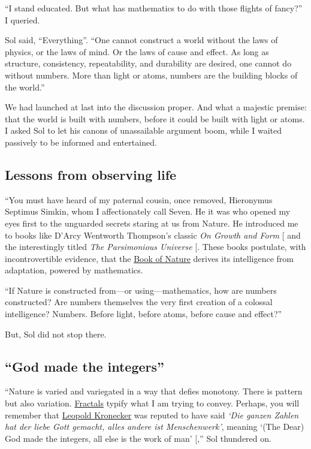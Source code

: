 \documentclass[
  a4paper,
]{article}
\begin{document}
``I stand educated. But what has mathematics to do with those flights of
fancy?'' I queried.

Sol said, ``Everything''. ``One cannot construct a world without the
laws of physics, or the laws of mind. Or the laws of cause and effect.
As long as structure, consistency, repeatability, and durability are
desired, one cannot do without numbers. More than light or atoms,
numbers are the building blocks of the world.''

We had launched at last into the discussion proper. And what a majestic
premise: that the world is built with numbers, before it could be built
with light or atoms. I asked Sol to let his canons of unassailable
argument boom, while I waited passively to be informed and entertained.

\subsection{Lessons from observing
life}\label{lessons-from-observing-life}

``You must have heard of my paternal cousin, once removed, Hieronymus
Septimus Simkin, whom I affectionately call Seven. He it was who opened
my eyes first to the unguarded secrets staring at us from Nature. He
introduced me to books like D'Arcy Wentworth Thompson's classic \emph{On
Growth and Form} {[}\citeproc{ref-thompson-1992}{1}{]} and the
interestingly titled \emph{The Parsimonious Universe}
{[}\citeproc{ref-parsimonious-1996}{2}{]}. These books postulate, with
incontrovertible evidence, that the
\href{https://en.wikipedia.org/wiki/Book_of_Nature}{Book of Nature}
derives its intelligence from adaptation, powered by mathematics.

``If Nature is constructed from---or using---mathematics, how are
numbers constructed? Are numbers themselves the very first creation of a
colossal intelligence? Numbers. Before light, before atoms, before cause
and effect?''

But, Sol did not stop there.

\subsection{``God made the integers''}\label{god-made-the-integers}

``Nature is varied and variegated in a way that defies monotony. There
is pattern but also variation.
\href{https://www.treehugger.com/amazing-fractals-found-in-nature-4868776}{Fractals}
typify what I am trying to convey. Perhaps, you will remember that
\href{https://en.wikipedia.org/wiki/Leopold_Kronecker}{Leopold
Kronecker} was reputed to have said \emph{`Die ganzen Zahlen hat der
liebe Gott gemacht, alles andere ist Menschenwerk'}, meaning `(The Dear)
God made the integers, all else is the work of man'
{[}\citeproc{ref-kronecker}{3}{]},'' Sol thundered on.
\end{document}
